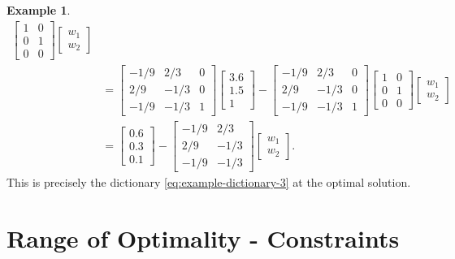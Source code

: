 \documentclass[
]{book}
\theoremstyle{definition}
\theoremstyle{definition}
\newtheorem{example}{Example}[chapter]
\theoremstyle{definition}
\theoremstyle{definition}
\theoremstyle{remark}
\begin{document}
\begin{example}
\begin{align*}
\begin{bmatrix}
    1 & 0 \\
    0 & 1 \\
    0 & 0
    \end{bmatrix}
  \begin{bmatrix} w_1 \\ w_2 \end{bmatrix} \\
  & = \begin{bmatrix}
    -1/9 & 2/3 & 0 \\
    2/9 & -1/3 & 0 \\
    -1/9 & -1/3 & 1
    \end{bmatrix} 
    \begin{bmatrix}
    3.6 \\ 1.5 \\ 1 
    \end{bmatrix} - 
    \begin{bmatrix}
    -1/9 & 2/3 & 0 \\
    2/9 & -1/3 & 0 \\
    -1/9 & -1/3 & 1
    \end{bmatrix}  
    \begin{bmatrix}
    1 & 0 \\
    0 & 1 \\
    0 & 0
    \end{bmatrix}
  \begin{bmatrix} w_1 \\ w_2 \end{bmatrix} \\
  & 
  = \begin{bmatrix} 0.6 \\ 0.3 \\ 0.1 \end{bmatrix} 
  -
  \begin{bmatrix}
    -1/9 & 2/3 \\ 
    2/9 & -1/3 \\
    -1/9 & -1/3
  \end{bmatrix}
  \begin{bmatrix} w_1 \\ w_2 \end{bmatrix}.
\end{align*}
This is precisely the dictionary \eqref{eq:example-dictionary-3} at the optimal solution.
\end{example}

\hypertarget{range-of-optimality---constraints}{%
\section{Range of Optimality - Constraints}\label{range-of-optimality---constraints}}
\end{document}
